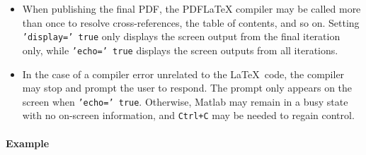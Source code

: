  \begin{itemize}
 \item
   When publishing the final PDF, the PDFLaTeX compiler may be called
   more than once to resolve cross-references, the table of contents, and
   so on. Setting \texttt{'display=' true} only displays the screen
   output from the final iteration only, while \texttt{'echo=' true}
   displays the screen outputs from all iterations.
 \item
   In the case of a compiler error unrelated to the \LaTeX~code, the
   compiler may stop and prompt the user to respond. The prompt only
   appears on the screen when \texttt{'echo=' true}. Otherwise, Matlab
   may remain in a busy state with no on-screen information, and
   \texttt{Ctrl+C} may be needed to regain control.
 \end{itemize}
 
 \paragraph{Example}


